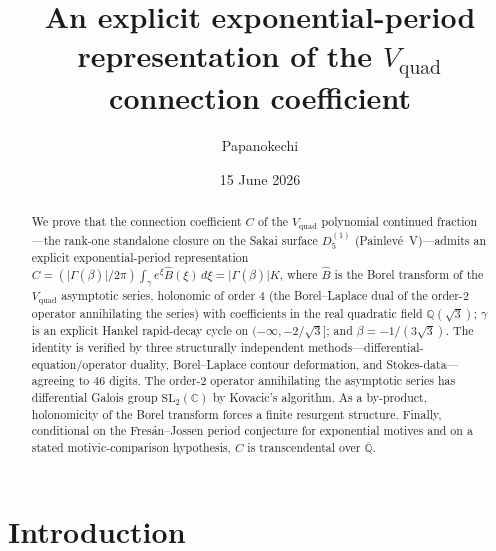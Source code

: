 \documentclass[11pt,reqno]{amsart}
\title[An exponential-period representation of the $V_{\mathrm{quad}}$ constant]%
{An explicit exponential-period representation of the $V_{\mathrm{quad}}$ connection coefficient}
\author{Papanokechi}
\date{15 June 2026}
\renewcommand{\_}{\vquadorigunderscore\allowbreak}
\theoremstyle{plain}
\theoremstyle{definition}
\newcommand{\Vquad}{V_{\mathrm{quad}}}
\newcommand{\Bhat}{\widehat{B}}
\newcommand{\Qsqrt}{\mathbb{Q}(\sqrt3)}
\newcommand{\Qbar}{\overline{\mathbb{Q}}}
\newcommand{\SL}{\mathrm{SL}}
\begin{document}
\begin{abstract}
We prove that the connection coefficient $C$ of the $\Vquad$ polynomial continued fraction---the
rank-one standalone closure on the Sakai surface $D_5^{(1)}$ (Painlev\'e~V)---admits an explicit
exponential-period representation
$C=(\lvert\Gamma(\beta)\rvert/2\pi)\int_\gamma e^{\xi}\Bhat(\xi)\,d\xi=\lvert\Gamma(\beta)\rvert K$,
where $\Bhat$ is the Borel transform of the $\Vquad$ asymptotic series, holonomic of order $4$
(the Borel--Laplace dual of the order-$2$ operator annihilating the series)
with coefficients in the real quadratic field $\Qsqrt$; $\gamma$ is an explicit Hankel
rapid-decay cycle on $(-\infty,-2/\sqrt3]$; and $\beta=-1/(3\sqrt3)$. The identity is verified by
three structurally independent methods---differential-equation/operator duality, Borel--Laplace
contour deformation, and Stokes-data---agreeing to $46$ digits. The order-$2$ operator annihilating
the asymptotic series has differential Galois group $\SL_2(\mathbb{C})$ by Kovacic's algorithm.
As a by-product, holonomicity of the Borel transform forces a finite resurgent structure. Finally,
conditional on the Fres\'an--Jossen period conjecture for exponential motives and on a stated
motivic-comparison hypothesis, $C$ is transcendental over $\Qbar$.
\end{abstract}
\maketitle

\section{Introduction}\label{sec:intro}
\end{document}
